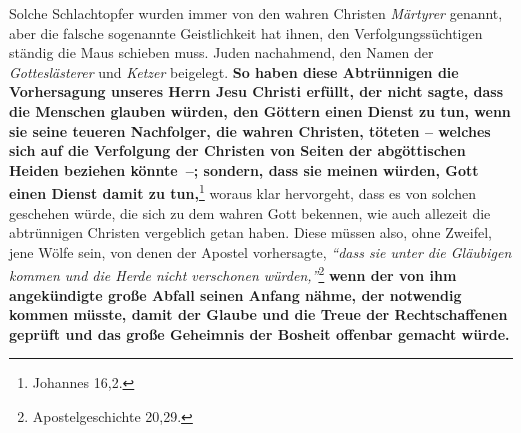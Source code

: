 Solche Schlachtopfer wurden immer von den wahren Christen
\textit{Märtyrer} genannt,
aber die falsche sogenannte Geistlichkeit
hat ihnen, den Verfolgungssüchtigen
ständig die Maus schieben muss.
Juden nachahmend, den Namen der
\textit{Gotteslästerer} und
\textit{Ketzer} beigelegt.  \label{ref:07_16_vervolgung}
\textbf{So haben diese Abtrünnigen die Vorhersagung
unseres Herrn Jesu Christi erfüllt, der nicht sagte, dass die Menschen glauben
würden, den Göttern einen Dienst zu tun, wenn sie seine teueren Nachfolger, die
wahren Christen, töteten
-- welches sich auf die Verfolgung der Christen von Seiten der abgöttischen
Heiden beziehen könnte~--; sondern, dass sie meinen
würden, Gott einen Dienst
damit zu tun,}\footnote{Johannes 16,2.}
woraus klar hervorgeht, dass es von solchen
geschehen würde, die sich zu dem wahren Gott bekennen, wie auch allezeit die
abtrünnigen Christen vergeblich getan haben. Diese müssen also, ohne Zweifel,
jene Wölfe sein, von denen der Apostel vorhersagte,
\textit{"`dass sie unter die
Gläubigen kommen und die Herde nicht verschonen
würden,"'}\footnote{Apostelgeschichte 20,29.}
\textbf{wenn der von ihm angekündigte große Abfall seinen Anfang nähme, der
notwendig kommen müsste, damit der Glaube und die Treue der
Rechtschaffenen
geprüft und das große Geheimnis der Bosheit offenbar gemacht würde.}

\medskip

